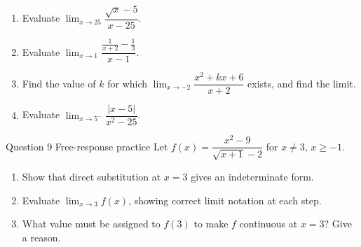 \documentclass[11pt]{article}
\begin{document}
\begin{enumerate}[leftmargin=*,itemsep=2pt,start=5]
  \item Evaluate $\displaystyle\lim_{x\to 25}\dfrac{\sqrt x-5}{x-25}$.\work{2.8cm}
  \item Evaluate $\displaystyle\lim_{x\to 1}\dfrac{\frac{1}{x+2}-\frac13}{x-1}$.\work{2.8cm}
  \item Find the value of $k$ for which $\displaystyle\lim_{x\to -2}\dfrac{x^2+kx+6}{x+2}$ exists, and find the limit.\work{2.8cm}
  \item Evaluate $\displaystyle\lim_{x\to 5^-}\dfrac{|x-5|}{x^2-25}$.\work{2.8cm}
\end{enumerate}

\begin{frbox}{Question 9 \textperiodcentered{} Free-response practice}
Let $f(x)=\dfrac{x^2-9}{\sqrt{x+1}-2}$ for $x\neq3$, $x\ge-1$.
\begin{enumerate}[label=(\alph*),leftmargin=*,itemsep=2pt]
  \item Show that direct substitution at $x=3$ gives an indeterminate form.\work{2.6cm}
  \item Evaluate $\displaystyle\lim_{x\to 3}f(x)$, showing correct limit notation at each step.\work{2.6cm}
  \item What value must be assigned to $f(3)$ to make $f$ continuous at $x=3$? Give a reason.\work{2.6cm}
\end{enumerate}
\end{frbox}
\end{document}
